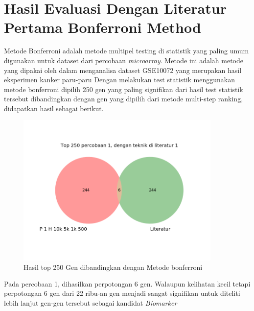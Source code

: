 \section{Hasil Evaluasi Dengan Literatur Pertama Bonferroni Method\citep{hochberg1988sharper}}

Metode Bonferroni adalah metode multipel testing di statistik yang paling umum digunakan untuk dataset dari percobaan \textit{microarray}. Metode ini adalah metode yang dipakai oleh \cite{landi2008gene} dalam menganalisa dataset GSE10072 yang merupakan hasil eksperimen kanker paru-paru \citep{landi2008gene} Dengan melakukan test statistik menggunakan metode bonferroni dipilih 250 gen yang paling signifikan dari hasil test statistik tersebut dibandingkan dengan gen yang dipilih dari metode multi-step ranking, didapatkan hasil sebagai berikut.

\begin{figure}
	\centering
	\includegraphics[width=0.9\textwidth]
		{pics/bon1.png}
	\caption{Hasil top 250 Gen dibandingkan dengan Metode bonferroni}
	\label{fig:bon1}
\end{figure}

Pada percobaan 1, dihasilkan perpotongan 6 gen. Walaupun kelihatan kecil tetapi perpotongan 6 gen dari 22 ribu-an gen menjadi sangat signifikan untuk diteliti lebih lanjut gen-gen tersebut sebagai kandidat \textit{Biomarker}

